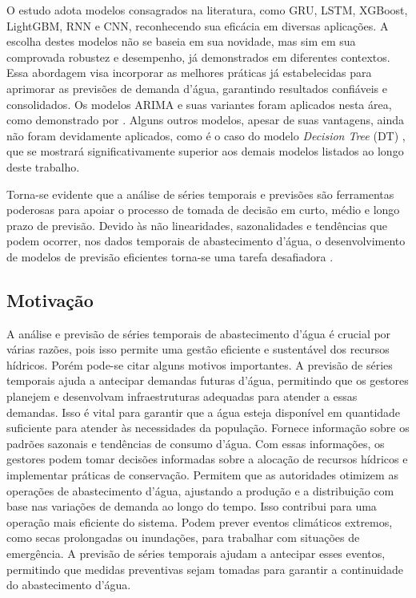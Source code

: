 O estudo adota modelos consagrados na literatura, como GRU, LSTM, XGBoost, LightGBM, RNN e CNN, reconhecendo sua eficácia em diversas aplicações. A escolha destes modelos não se baseia em sua novidade, mas sim em sua comprovada robustez e desempenho, já demonstrados em diferentes contextos. Essa abordagem visa incorporar as melhores práticas já estabelecidas para aprimorar as previsões de demanda d'água, garantindo resultados confiáveis e consolidados. Os modelos ARIMA e suas variantes foram aplicados nesta área, como demonstrado por \cite{2-s2.0-85069459067, 2-s2.0-85099424908}. Alguns outros modelos, apesar de suas vantagens, ainda não foram devidamente aplicados, como é o caso do modelo \textit{Decision Tree} (DT) \cite{2-s2.0-85054695177}, que se mostrará significativamente superior aos demais modelos listados ao longo deste trabalho.

Torna-se evidente que a análise de séries temporais e previsões são ferramentas poderosas para apoiar o processo de tomada de decisão em curto, médio e longo prazo de previsão. Devido às não linearidades, sazonalidades e tendências que podem ocorrer, nos dados temporais de abastecimento d'água, o desenvolvimento de modelos de previsão eficientes torna-se uma tarefa desafiadora \cite{mateus}.



\subsection{Motiva\c c\~ao} 
\label{subsubsec:motivacao}

A análise e previsão de séries temporais de abastecimento d'água é crucial por várias razões, pois isso permite uma gestão eficiente e sustentável dos recursos hídricos. Porém pode-se citar alguns motivos importantes. A previsão de séries temporais ajuda a antecipar demandas futuras d'água, permitindo que os gestores planejem e desenvolvam infraestruturas adequadas para atender a essas demandas. Isso é vital para garantir que a água esteja disponível em quantidade suficiente para atender às necessidades da população. Fornece informação sobre os padrões sazonais e tendências de consumo d'água. Com essas informações, os gestores podem tomar decisões informadas sobre a alocação de recursos hídricos e implementar práticas de conservação. Permitem que as autoridades otimizem as operações de abastecimento d'água, ajustando a produção e a distribuição com base nas variações de demanda ao longo do tempo. Isso contribui para uma operação mais eficiente do sistema. Podem prever eventos climáticos extremos, como secas prolongadas ou inundações, para trabalhar com situações de emergência. A previsão de séries temporais ajudam a antecipar esses eventos, permitindo que medidas preventivas sejam tomadas para garantir a continuidade do abastecimento d'água.

